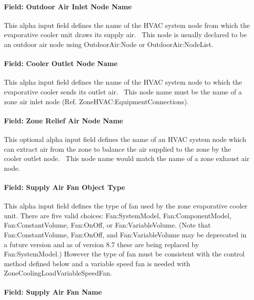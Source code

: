 \paragraph{Field: Outdoor Air Inlet Node Name}\label{field-outdoor-air-inlet-node-name-1-000}

This alpha input field defines the name of the HVAC system node from which the evaporative cooler unit draws its supply air.~ This node is usually declared to be an outdoor air node using OutdoorAir:Node or OutdoorAir:NodeList.

\paragraph{Field: Cooler Outlet Node Name}\label{field-cooler-outlet-node-name}

This alpha input field defines the name of the HVAC system node to which the evaporative cooler sends its outlet air.~ This node name must be the name of a zone air inlet node (Ref. ZoneHVAC:EquipmentConnections).

\paragraph{Field: Zone Relief Air Node Name}\label{field-zone-relief-air-node-name}

This optional alpha input field defines the name of an HVAC system node which can extract air from the zone to balance the air supplied to the zone by the cooler outlet node.~ This node name would match the name of a zone exhaust air node.

\paragraph{Field: Supply Air Fan Object Type}\label{field-supply-air-fan-object-type-3-000}

This alpha input field defines the type of fan used by the zone evaporative cooler unit.  There are five valid choices: Fan:SystemModel, Fan:ComponentModel, Fan:ConstantVolume, Fan:OnOff, or Fan:VariableVolume.  (Note that Fan:ConstantVolume, Fan:OnOff, and Fan:VariableVolume may be deprecated in a future version and as of version 8.7 these are being replaced by Fan:SystemModel.) 
However the type of fan must be consistent with the control method defined below and a variable speed fan is needed with ZoneCoolingLoadVariableSpeedFan.

\paragraph{Field: Supply Air Fan Name}\label{field-supply-air-fan-name-3-000}

